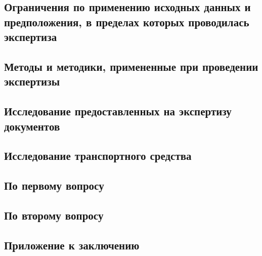 \subsection{Ограничения по применению исходных данных и предположения, в пределах которых проводилась экспертиза}


\subsection{Методы и методики, примененные при проведении экспертизы}


\subsection{Исследование предоставленных на экспертизу документов}


\subsection{Исследование транспортного средства}


\subsection{По первому вопросу}


\subsection{По второму вопросу}


\appendix
\subsection{Приложение к заключению} 





 
